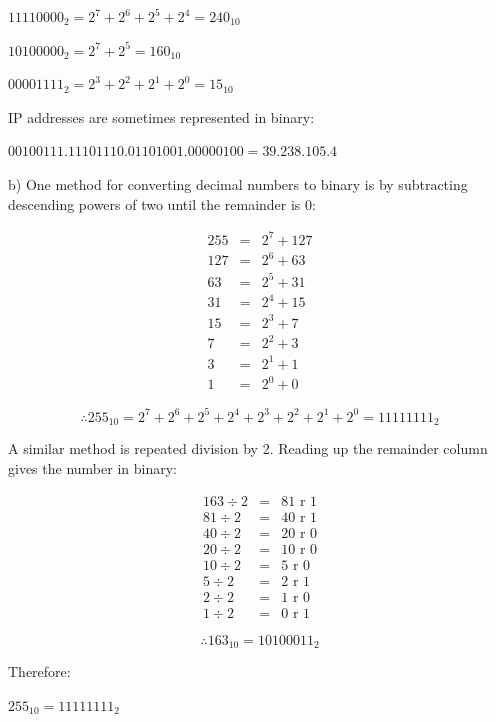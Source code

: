 \documentclass[a4paper,12pt]{report}
\begin{document}
$11110000_2 = 2^7+2^6+2^5+2^4 = 240_{10}$

$10100000_2 = 2^7+2^5 = 160_{10}$

$00001111_2 = 2^3+2^2+2^1+2^0 = 15_{10}$

IP addresses are sometimes represented in binary:

$00100111.11101110.01101001.00000100 = 39.238.105.4$

b) One method for converting decimal numbers to binary is by subtracting descending powers of two until the remainder is 0:

\begin{eqnarray*}
    255 &=& 2^7 + 127 \\
    127 &=& 2^6 + 63 \\
    63 &=& 2^5 + 31 \\
    31 &=& 2^4 + 15 \\
    15 &=& 2^3 + 7 \\
    7 &=& 2^2 + 3 \\
    3 &=& 2^1 + 1 \\
    1 &=& 2^0 + 0
\end{eqnarray*}

\begin{equation*}
    \therefore 255_{10} = 2^7 + 2^6 + 2^5 + 2^4 + 2^3 + 2^2 + 2^1 + 2^0 = 11111111_2
\end{equation*}

A similar method is repeated division by 2. Reading up the remainder column gives the number in binary:

\begin{eqnarray*}
    163 \div 2 &=& 81 \text{ r } 1 \\
    81 \div 2 &=& 40 \text{ r } 1 \\
    40 \div 2 &=& 20 \text{ r } 0 \\
    20 \div 2 &=& 10 \text{ r } 0 \\
    10 \div 2 &=& 5 \text{ r } 0 \\
    5 \div 2 &=& 2 \text{ r } 1 \\
    2 \div 2 &=& 1 \text{ r } 0 \\
    1 \div 2 &=& 0 \text{ r } 1
\end{eqnarray*}

\begin{equation*}
    \therefore 163_{10} = 10100011_2
\end{equation*}

Therefore:

$255_{10} = 11111111_2$
\end{document}
